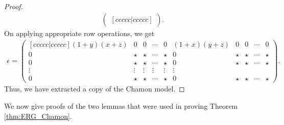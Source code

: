 \documentclass[prx,twocolumn,superscriptaddress,nofootinbib,showpacs,notitlepage]{revtex4-2}
\newcommand{\Chamon}{Chamon }
\begin{document}
\begin{proof}
\begin{align}
\begin{pmatrix}[ccccc|ccccc]
\end{pmatrix}. \label{eq:eps2}
\end{align}
On applying appropriate row operations, we get
\begin{align}
\epsilon = \begin{pmatrix}[ccccc|ccccc]
(1+y)(x+z) & 0 & 0 & \cdots & 0 & (1+x)(y+z) &  0 & 0 & \cdots & 0 \\
0 & \star & \star & \cdots & \star & 0 &  \star & \star & \cdots & \star \\
0     &\star & \star & \cdots & \star  & 0   &  \star & \star & \cdots & \star \\
\vdots&\vdots& \vdots & \vdots & \vdots & \vdots \\
0    & \star & \star & \cdots & \star  & 0   &  \star & \star & \cdots & \star 
\end{pmatrix}. \label{eq:eps3}
\end{align}
Thus, we have extracted a copy of the \Chamon model.
\end{proof}

We now give proofs of the two lemmas that were used in proving Theorem \ref{thm:ERG_Chamon}.
\end{document}
